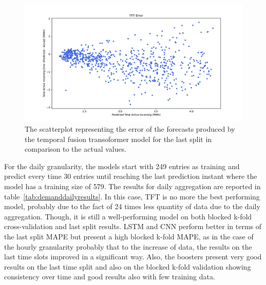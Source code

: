 \begin{figure}[H]
\centering
\includegraphics[width=1\textwidth]{images/demand/TFT_error_scatter_plot_predicted}
\caption{The scatterplot representing the error of the forecasts produced by the temporal fusion transoformer model for the last split in comparison to the actual values.}
\label{fig:demandtfthourlyforecastsscatterplot}
\end{figure}

For the daily granularity, the models start with 249 entries as training and predict every time 30 entries until reaching the last prediction instant where the model has a training size of 579.
The results for daily aggregation are reported in table~\ref{tab:demanddailyresults}.
In this case, TFT is no more the best performing model, probably due to the fact of 24 times less quantity of data due to the daily aggregation.
Though, it is still a well-performing model on both blocked k-fold cross-validation and last split results.
LSTM and CNN perform better in terms of the last split MAPE but present a high blocked k-fold MAPE, as in the case of the hourly granularity probably that to the increase of data, the results on the last time slots improved in a significant way.
Also, the boosters present very good results on the last time split and also on the blocked k-fold validation showing consistency over time and good results also with few training data. 

